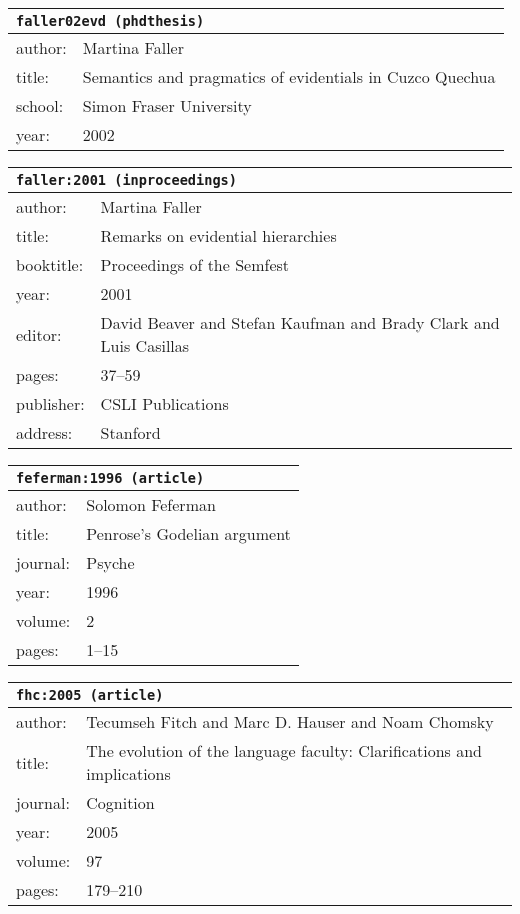 \documentclass{article}
\begin{document}
\bigskip

\begin{tabular}{p{}p{}}
\multicolumn{2}{l}{\texttt{faller02evd (phdthesis)}}\\
\hline
author: & Martina Faller\\
title: & Semantics and pragmatics of evidentials in Cuzco Quechua\\
school: & Simon Fraser University\\
year: & 2002\\
\end{tabular}

\bigskip

\begin{tabular}{p{}p{}}
\multicolumn{2}{l}{\texttt{faller:2001 (inproceedings)}}\\
\hline
author: & Martina Faller\\
title: & Remarks on evidential hierarchies\\
booktitle: & Proceedings of the Semfest\\
year: & 2001\\
editor: & David Beaver and Stefan Kaufman and Brady Clark and Luis Casillas\\
pages: & 37--59\\
publisher: & CSLI Publications\\
address: & Stanford\\
\end{tabular}

\bigskip

\begin{tabular}{p{}p{}}
\multicolumn{2}{l}{\texttt{feferman:1996 (article)}}\\
\hline
author: & Solomon Feferman\\
title: & Penrose's Godelian argument\\
journal: & Psyche\\
year: & 1996\\
volume: & 2\\
pages: & 1--15\\
\end{tabular}

\bigskip

\begin{tabular}{p{}p{}}
\multicolumn{2}{l}{\texttt{fhc:2005 (article)}}\\
\hline
author: & Tecumseh Fitch and Marc D. Hauser and Noam Chomsky\\
title: & The evolution of the language faculty: Clarifications and implications\\
journal: & Cognition\\
year: & 2005\\
volume: & 97\\
pages: & 179--210\\
\end{tabular}
\end{document}
